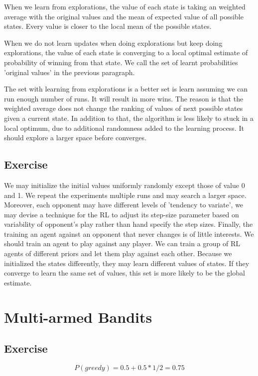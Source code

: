 \documentclass[11pt,a4paper]{report}
\begin{document}
When we learn from explorations, the value of each state is taking an weighted average with the original values and the mean of expected value of all possible states. Every value is closer to the local mean of the possible states. 

When we do not learn updates when doing explorations but keep doing explorations, the value of each state is converging to a local optimal estimate of probability of winning from that state. We call the set of learnt probabilities 'original values' in the previous paragraph.

The set with learning from explorations is a better set is learn assuming we can run enough number of runs. It will result in more wins. The reason is that the weighted average does not change the ranking of values of next possible states given a current state. In addition to that, the algorithm is less likely to stuck in a local optimum, due to additional randomness added to the learning process. It should explore a larger space before converges.

\section{Exercise}

We may initialize the initial values uniformly randomly except those of value 0 and 1. We repeat the experiments multiple runs and may search a larger space.
Moreover, each opponent may have different levels of 'tendency to variate', we may devise a technique for the RL to adjust its step-size parameter based on variability of opponent's play rather than hand specify the step sizes.
Finally, the training an agent against an opponent that never changes is of little interests. We should train an agent to play against any player. We can train a group of RL agents of different priors and let them play against each other. Because we initialized the states differently, they may learn different values of states. If they converge to learn the same set of values, this set is more likely to be the global estimate.


\chapter{Multi-armed Bandits}

\section{Exercise}
$$P(greedy) = 0.5 + 0.5 * 1/2 = 0.75$$
\end{document}
